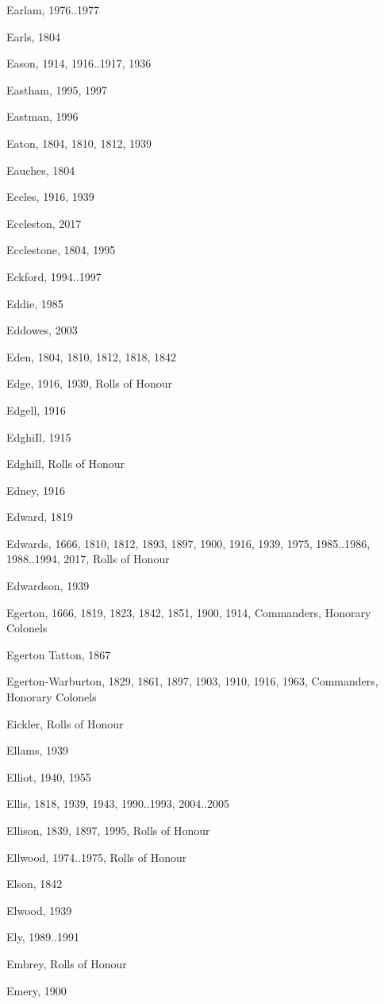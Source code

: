 \begin{theindex}
\item Earlam, 1976..1977
\item Earls, 1804
\item Eason, 1914, 1916..1917, 1936
\item Eastham, 1995, 1997
\item Eastman, 1996
\item Eaton, 1804, 1810, 1812, 1939
\item Eauches, 1804
\item Eccles, 1916, 1939
\item Eccleston, 2017
\item Ecclestone, 1804, 1995
\item Eckford, 1994..1997
\item Eddie, 1985
\item Eddowes, 2003
\item Eden, 1804, 1810, 1812, 1818, 1842
\item Edge, 1916, 1939, Rolls of Honour
\item Edgell, 1916
\item EdghiIl, 1915
\item Edghill, Rolls of Honour
\item Edney, 1916
\item Edward, 1819
\item Edwards, 1666, 1810, 1812, 1893, 1897, 1900, 1916, 1939, 1975, 1985..1986, 1988..1994, 2017, Rolls of Honour
\item Edwardson, 1939
\item Egerton, 1666, 1819, 1823, 1842, 1851, 1900, 1914, Commanders, Honorary Colonels
\item Egerton Tatton, 1867
\item Egerton-Warburton, 1829, 1861, 1897, 1903, 1910, 1916, 1963, Commanders, Honorary Colonels
\item Eickler, Rolls of Honour
\item Ellams, 1939
\item Elliot, 1940, 1955
\item Ellis, 1818, 1939, 1943, 1990..1993, 2004..2005
\item Ellison, 1839, 1897, 1995, Rolls of Honour
\item Ellwood, 1974..1975, Rolls of Honour
\item Elson, 1842
\item Elwood, 1939
\item Ely, 1989..1991
\item Embrey, Rolls of Honour
\item Emery, 1900

\end{theindex}
